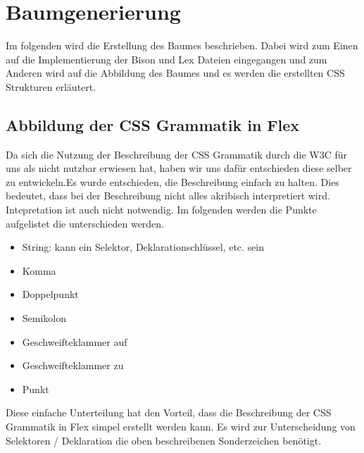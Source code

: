 \section{Baumgenerierung}
Im folgenden wird die Erstellung des Baumes beschrieben. Dabei wird zum Einen auf die Implementierung der Bison und Lex Dateien eingegangen und zum Anderen wird auf die Abbildung des Baumes und es werden die erstellten CSS Strukturen erläutert.

\subsection{Abbildung der CSS Grammatik in Flex}
\label{tree_generation_lex}
Da sich die Nutzung der Beschreibung der CSS Grammatik durch die W3C für uns als nicht nutzbar erwiesen hat, haben wir uns dafür entschieden diese selber zu entwickeln.Es wurde entschieden, die Beschreibung einfach zu halten. Dies bedeutet, dass bei der Beschreibung nicht alles akribisch interpretiert wird. Intepretation ist auch nicht notwendig. Im folgenden werden die Punkte aufgelistet die unterschieden werden. 
\begin{itemize}
\item{String: kann ein Selektor, Deklarationschlüssel, etc. sein} 
\item{Komma} 
\item{Doppelpunkt} 
\item{Semikolon} 
\item{Geschweifteklammer auf} 
\item{Geschweifteklammer zu} 
\item{Punkt} 
\end{itemize}
Diese einfache Unterteilung hat den Vorteil, dass die Beschreibung der CSS Grammatik in Flex simpel erstellt werden kann. Es wird zur Unterscheidung von Selektoren / Deklaration die oben beschreibenen Sonderzeichen benötigt. 
